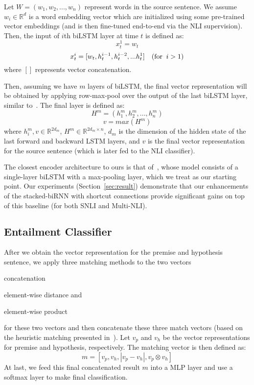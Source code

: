 \documentclass[11pt,letterpaper]{article}
\begin{document}
Let $W=(w_1, w_2, ..., w_n)$ represent words in the source sentence. We assume $w_i \in \mathbb{R}^d$ is a word embedding vector which are initialized using some pre-trained vector embeddings (and is then fine-tuned end-to-end via the NLI supervision). Then, the input of $i$th biLSTM layer at time $t$ is defined as:
\begin{equation}
x_t^1 = w_t
\end{equation}
\begin{equation}
x_t^i = [w_t, h_t^{i-1}, h_t^{i-2}, ... h_t^{1}] \quad (\textrm{for} \;\; i>1)\\
\end{equation}
where $[]$ represents vector concatenation.

Then, assuming we have $m$ layers of biLSTM, the final vector representation will be obtained by applying row-max-pool over the output of the last biLSTM layer, similar to~. The final layer is defined as:
\begin{equation}
H^m=(h_1^m, h_2^m, ..., h_n^m)
\end{equation}
\begin{equation}
v=max(H^m)
\end{equation}
where $h_i^m,v \in \mathbb{R}^{2d_m}$, $H^m \in \mathbb{R}^{2d_m \times n}$, $d_m$ is the dimension of the hidden state of the last forward and backward LSTM layers, and $v$ is the final vector representation for the source sentence (which is later fed to the NLI classifier).


The closest encoder architecture to ours is that of~, whose model consists of a single-layer biLSTM with a max-pooling layer, which we treat as our starting point. Our experiments (Section~\ref{sec:result}) demonstrate that  our enhancements of the stacked-biRNN with shortcut connections provide significant gains on top of this baseline (for both SNLI and Multi-NLI).


\subsection{Entailment Classifier}
After we obtain the vector representation for the premise and hypothesis sentence, we apply three matching methods to the two vectors \begin{inparaenum}[(i)]
\item{concatenation}
\item{element-wise distance} and
\item{element-wise product}
\end{inparaenum} for these two vectors and then concatenate these three match vectors (based on the heuristic matching presented in~). Let $v_p$ and $v_h$ be the vector representations for premise and hypothesis, respectively. The matching vector is then defined as:
\begin{equation}
m=[v_p, v_h, \left|v_p - v_h\right|, v_p \otimes v_h]
\end{equation}
At last, we feed this final concatenated result $m$ into a MLP layer and use a softmax layer to make final classification.
\end{document}
